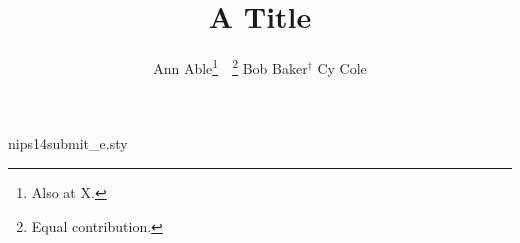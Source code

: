 \begin{filecontents*}[overwrite]{nips14submit_e.sty}
\def\maketitle{\par
\begingroup
   \def\thefootnote{\fnsymbol{footnote}}
   \def\@makefnmark{\hbox to 0pt{$^{\@thefnmark}$\hss}}
   \@maketitle \@thanks
\endgroup
\setcounter{footnote}{0}
\let\maketitle\relax \let\@maketitle\relax
\gdef\@thanks{}\gdef\@author{}\gdef\@title{}\let\thanks\relax}
\def\@maketitle{\vbox{\hsize\textwidth\centering{\LARGE\bf \@title\par}
  \def\And{\end{tabular}\hfil\linebreak[0]\hfil\begin{tabular}[t]{c}\bf\ignorespaces}%
  \begin{tabular}[t]{c}\bf\@author\end{tabular}}}
\end{filecontents*}
\documentclass{article}
\usepackage{nips14submit_e}
\title{A Title}
\author{Ann Able\thanks{Also at X.}\ \ \thanks{Equal contribution.} \And Bob Baker$^\dagger$ \And Cy Cole}

\maketitle
Body.

